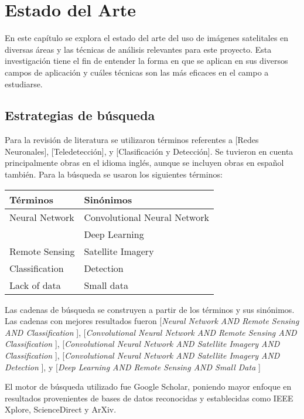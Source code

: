 \section{Estado del Arte}

En este capítulo se explora el estado del arte del uso de imágenes satelitales en diversas áreas y las técnicas de
análisis relevantes para este proyecto. Esta investigación tiene el fin de entender la forma en que se aplican en sus
diversos campos de aplicación y cuáles técnicas son las más eficaces en el campo a estudiarse.

\subsection{Estrategias de búsqueda}

Para la revisión de literatura se utilizaron términos referentes a [Redes Neuronales], [Teledetección], y
[Clasificación y Detección]. Se tuvieron en cuenta principalmente obras en el idioma inglés, aunque se incluyen obras
en español también. Para la búsqueda se usaron los siguientes términos:

\begin{center}
    \begin{tabular}{ l | l }
        {\bf Términos } & {\bf Sinónimos } \\
        \hline
        Neural Network & Convolutional Neural Network \\
                       & Deep Learning \\
        \hline
        Remote Sensing & Satellite Imagery \\
        \hline
        Classification & Detection \\
        \hline
        Lack of data & Small data \\
    \end{tabular}
\end{center}

Las cadenas de búsqueda se construyen a partir de los términos y sus sinónimos. Las cadenas con mejores resultados
fueron
[{\it Neural Network AND Remote Sensing AND Classification }],
[{\it Convolutional Neural Network AND Remote Sensing AND Classification }],
[{\it Convolutional Neural Network AND Satellite Imagery AND Classification }],
[{\it Convolutional Neural Network AND Satellite Imagery AND Detection }], y
[{\it Deep Learning AND Remote Sensing AND Small Data }]

El motor de búsqueda utilizado fue Google Scholar, poniendo mayor enfoque en resultados provenientes de bases de datos
reconocidas y establecidas como IEEE Xplore, ScienceDirect y ArXiv.

